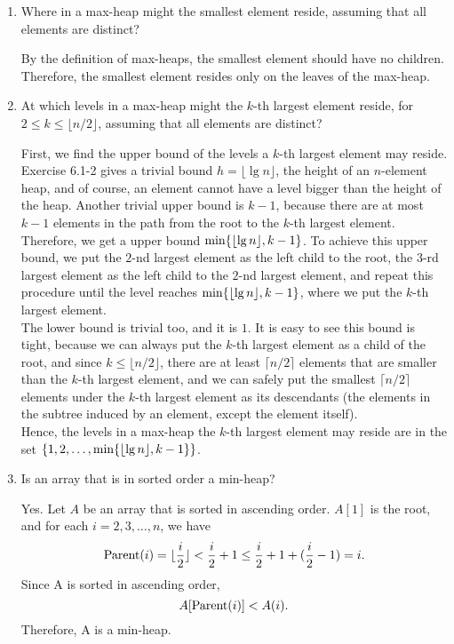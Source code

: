 \documentclass[12pt,reqno]{amsart}
\newif\ifanswer
\begin{document}
\begin{enumerate}[1.]
\item Where in a max-heap might the smallest element reside, assuming that all elements are distinct?

\ifanswer
{}
By the definition of max-heaps, the smallest element should have no children. Therefore, the smallest element resides only on the leaves of the max-heap.
\vspace{1cm}



\item At which levels in a max-heap might the $k$-th largest element reside, for $2\leq k\leq \lfloor n/2\rfloor$, assuming that all elements are distinct?

\ifanswer
{}
First, we find the upper bound of the levels a $k$-th largest element may reside. Exercise 6.1-2 gives a trivial bound $h = \lfloor \lg{n} \rfloor$, the height of an $n$-element heap, and of course, an element cannot have a level bigger than the height of the heap. Another trivial upper bound is $k-1$, because there are at most $k-1$ elements in the path from the root to the $k$-th largest element. Therefore, we get a upper bound $\textup{min}\{\lfloor \lg{n} \rfloor, k-1\}$. To achieve this upper bound, we put the $2$-nd largest element as the left child to the root, the $3$-rd largest element as the left child to the $2$-nd largest element, and repeat this procedure until the level reaches $\textup{min}\{\lfloor \lg{n} \rfloor, k-1\}$, where we put the $k$-th largest element.\\
\indent The lower bound is trivial too, and it is $1$. It is easy to see this bound is tight, because we can always put the $k$-th largest element as a child of the root, and since $k\leq\lfloor n/2 \rfloor$, there are at least $\lceil n/2 \rceil$ elements that are smaller than the $k$-th largest element, and we can safely put the smallest $\lceil n/2 \rceil$ elements under the $k$-th largest element as its descendants (the elements in the subtree induced by an element, except the element itself).\\
\indent Hence, the levels in a max-heap the $k$-th largest element may reside are in the set $\{1, 2, \dots, \textup{min}\{\lfloor \lg{n} \rfloor, k-1\}\}$.
\vspace{1cm}



\item Is an array that is in sorted order a min-heap?

\ifanswer
{}
Yes. Let $A$ be an array that is sorted in ascending order. $A[1]$ is the root, and for each $i=2, 3, \dots, n$, we have
$$
\textup{Parent}(i) = \lfloor\frac{i}{2}\rfloor < \frac{i}{2}+1 \leq \frac{i}{2}+1 + (\frac{i}{2} - 1) = i.
$$
Since A is sorted in ascending order,
$$
A[\textup{Parent}(i)] < A(i).
$$
Therefore, A is a min-heap.
\vspace{1cm}




\end{enumerate}
\end{document}
